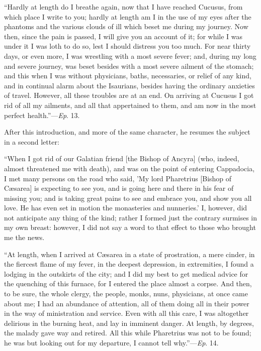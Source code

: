 ``Hardly at length do I breathe again, now that I have reached
Cucusus, from which place I write to you; hardly at length am I in the
use of my eyes after the phantoms and the various clouds of ill which
beset me during my journey. Now then, since the pain is passed, I will
give you an account of it; for while I was under it I was loth to do
so, lest I should distress you too much. For near thirty days, or even
more, I was wrestling with a most severe fever; and, during my long
and severe journey, was beset besides with a most severe ailment of
the stomach; and this when I was without physicians, baths,
necessaries, or relief of any kind, and in continual alarm about the
Isaurians, besides having the ordinary anxieties of travel. However,
all these troubles are at an end. On arriving at Cucusus I got rid of
all my ailments, and all that appertained to them, and am now in the
most perfect health.''—\emph{Ep}. 13.

After this introduction, and more of the same character, he resumes
the subject in a second letter:

``When I got rid of our Galatian friend [the Bishop of Ancyra]
(who, indeed, almost threatened me with death), and was on the point
of entering Cappadocia, I met many persons on the road who
said, 'My lord Pharetrius [Bishop of Cæsarea] is expecting to see
you, and is going here and there in his fear of missing you; and is
taking great pains to see and embrace you, and show you all love. He
has even set in motion the monasteries and nunneries.' I, however, did
not anticipate any thing of the kind; rather I formed just the
contrary surmises in my own breast: however, I did not say a word to
that effect to those who brought me the news.

``At length, when I arrived at Cæsarea in a state of
prostration, a mere cinder, in the fiercest flame of my fever, in the
deepest depression, in extremities, I found a lodging in the outskirts
of the city; and I did my best to get medical advice for the quenching
of this furnace, for I entered the place almost a corpse. And then, to
be sure, the whole clergy, the people, monks, nuns, physicians, at
once came about me; I had an abundance of attention, all of them doing
all in their power in the way of ministration and service. Even with
all this care, I was altogether delirious in the burning heat, and lay
in imminent danger. At length, by degrees, the malady gave way and
retired. All this while Pharetrius was not to be found; he was but
looking out for my departure, I cannot tell why.''—\emph{Ep}.
14.

